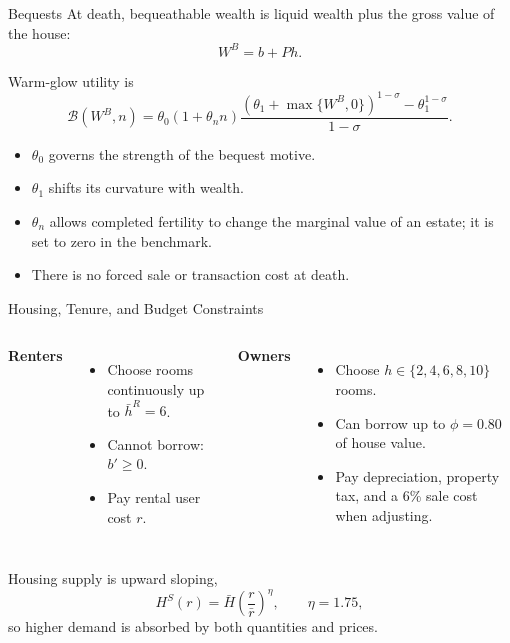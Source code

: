 \documentclass[aspectratio=169,11pt]{beamer}
\newcommand{\source}[1]{}
\newcommand{\tightitems}{\setlength{\itemsep}{0.55em}}
\newcommand{\1}{\mathbf 1}
\newcommand{\Bcal}{\mathcal B}
\begin{document}
\begin{frame}{Bequests}
  At death, bequeathable wealth is liquid wealth plus the gross value of the house:
  \[
    W^B=b+Ph.
  \]

  Warm-glow utility is
  \[
    \Bcal(W^B,n)
    =\theta_0(1+\theta_n n)
    \frac{(\theta_1+\max\{W^B,0\})^{1-\sigma}-\theta_1^{1-\sigma}}
    {1-\sigma}.
  \]

  \begin{itemize}\tightitems
    \item $\theta_0$ governs the strength of the bequest motive.
    \item $\theta_1$ shifts its curvature with wealth.
    \item $\theta_n$ allows completed fertility to change the marginal value of an estate; it is set to zero in the benchmark.
    \item There is no forced sale or transaction cost at death.
  \end{itemize}
\end{frame}

\begin{frame}{Housing, Tenure, and Budget Constraints}
  \begin{columns}[T,onlytextwidth]
      \textbf{Renters}
      \begin{itemize}\tightitems
        \item Choose rooms continuously up to $\bar h^R=6$.
        \item Cannot borrow: $b'\ge0$.
        \item Pay rental user cost $r$.
      \end{itemize}
      \textbf{Owners}
      \begin{itemize}\tightitems
        \item Choose $h\in\{2,4,6,8,10\}$ rooms.
        \item Can borrow up to $\phi=0.80$ of house value.
        \item Pay depreciation, property tax, and a 6\% sale cost when adjusting.
      \end{itemize}
  \end{columns}

  \vspace{0.7em}
  Housing supply is upward sloping,
  \[
    H^S(r)=\bar H\left(\frac{r}{\bar r}\right)^\eta,
    \qquad \eta=1.75,
  \]
  so higher demand is absorbed by both quantities and prices.
  \source{Circulated note, Quantitative Model: Housing, finance, and taxes.}
\end{frame}
\end{document}
